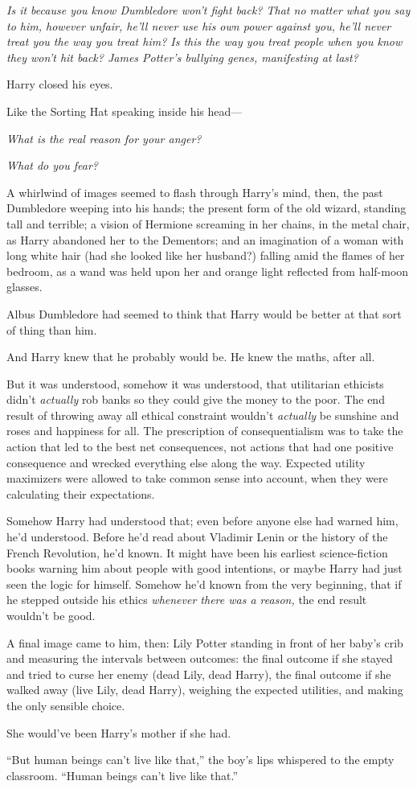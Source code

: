 \emph{Is it because you know Dumbledore won’t fight back? That no matter what you say to him, however unfair, he’ll never use his own power against you, he’ll never treat you the way you treat him? Is this the way you treat people when you know they won’t hit back? James Potter’s bullying genes, manifesting at last?}

Harry closed his eyes.

Like the Sorting Hat speaking inside his head—

\emph{What is the real reason for your anger?}

\emph{What do you fear?}

A whirlwind of images seemed to flash through Harry’s mind, then, the past Dumbledore weeping into his hands; the present form of the old wizard, standing tall and terrible; a vision of Hermione screaming in her chains, in the metal chair, as Harry abandoned her to the Dementors; and an imagination of a woman with long white hair (had she looked like her husband?) falling amid the flames of her bedroom, as a wand was held upon her and orange light reflected from half-moon glasses.

Albus Dumbledore had seemed to think that Harry would be better at that sort of thing than him.

And Harry knew that he probably would be. He knew the maths, after all.

But it was understood, somehow it was understood, that utilitarian ethicists didn’t \emph{actually} rob banks so they could give the money to the poor. The end result of throwing away all ethical constraint wouldn’t \emph{actually} be sunshine and roses and happiness for all. The prescription of consequentialism was to take the action that led to the best net consequences, not actions that had one positive consequence and wrecked everything else along the way. Expected utility maximizers were allowed to take common sense into account, when they were calculating their expectations.

Somehow Harry had understood that; even before anyone else had warned him, he’d understood. Before he’d read about Vladimir Lenin or the history of the French Revolution, he’d known. It might have been his earliest science-fiction books warning him about people with good intentions, or maybe Harry had just seen the logic for himself. Somehow he’d known from the very beginning, that if he stepped outside his ethics \emph{whenever there was a reason,} the end result wouldn’t be good.

A final image came to him, then: Lily Potter standing in front of her baby’s crib and measuring the intervals between outcomes: the final outcome if she stayed and tried to curse her enemy (dead Lily, dead Harry), the final outcome if she walked away (live Lily, dead Harry), weighing the expected utilities, and making the only sensible choice.

She would’ve been Harry’s mother if she had.

“But human beings can’t live like that,” the boy’s lips whispered to the empty classroom. “Human beings can’t live like that.”

